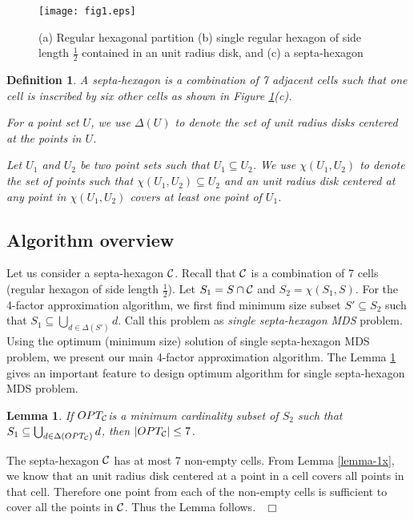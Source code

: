\documentclass[a4paper,11pt]{article}
\newtheorem{lemma}{Lemma}
\newtheorem{definition}{Definition}
\newenvironment{proof}{\noindent {\bf Proof:\,\ }}{\hfill\mbox{\
$\Box$}\smallskip}
\begin{document}
\begin{figure}[!ht]
\begin{center} 
\texttt{[image: fig1.eps]}\\
\caption{(a) Regular hexagonal partition (b) single regular hexagon of side length $\frac{1}{2}$ contained 
in an unit radius disk, and (c) a septa-hexagon}
\label{figure-2}
\end{center}
\vspace{-0.2in}
\end{figure}

\begin{definition}
A {\it septa-hexagon} is a combination of 7 adjacent cells such that one cell is inscribed by six other 
cells as shown in Figure \ref{figure-2}(c). 

For a point set $U$, we use $\Delta(U)$ to denote the set of unit radius disks centered at the points in $U$.

Let $U_1$ and $U_2$ be two point sets such that $U_1 \subseteq U_2$. We use $\chi(U_1, U_2)$ to denote the set 
of points such that $\chi(U_1, U_2) \subseteq U_2$ and an unit radius disk centered at any point in 
$\chi(U_1, U_2)$ covers at least one point of $U_1$.
\end{definition}


\subsection{Algorithm overview}
Let us consider a septa-hexagon ${\cal C}$. Recall that ${\cal C}$ is a combination of 7 cells (regular 
hexagon of side length $\frac{1}{2}$). Let $S_1 = S \cap {\cal C}$ and $S_2 = \chi(S_1, S)$. For the 
4-factor approximation algorithm, we first find minimum size subset $S' \subseteq S_2$ such that 
$S_1 \subseteq \bigcup_{d \in \Delta(S')}d$. Call this problem as {\it single septa-hexagon MDS} problem. 
Using the optimum (minimum size) solution of single septa-hexagon MDS problem, we present our main 4-factor 
approximation algorithm. The Lemma \ref{lemma-2x} gives an important feature to design optimum algorithm for
single septa-hexagon MDS problem. 


\begin{lemma} \label{lemma-2x}
 If $OPT_{\cal C}$is a minimum cardinality subset of $S_2$ such that 
$S_1 \subseteq \bigcup_{d \in \Delta(OPT_{\cal C})}d$, then $|OPT_{\cal C}| \leq 7$.
\end{lemma}

\begin{proof}
The septa-hexagon ${\cal C}$ has at most 7 non-empty cells. From Lemma \ref{lemma-1x}, we know that 
an unit radius disk centered at a point in a cell covers all points in that cell. Therefore one point 
from each of the non-empty cells is sufficient to cover all the points in ${\cal C}$. Thus the 
Lemma follows. 
\end{proof}
\end{document}
